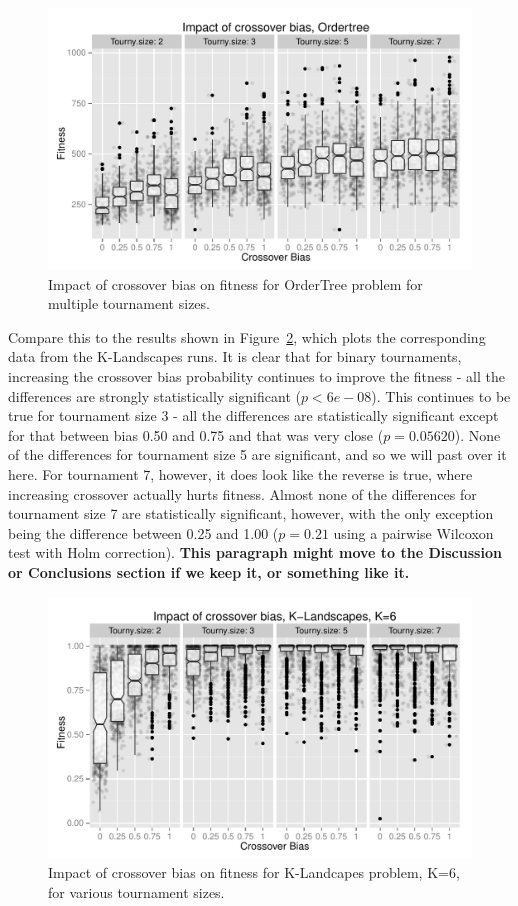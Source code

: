 \documentclass{sig-alternate}
\begin{document}
\begin{figure}
\centering
\includegraphics[width=0.45 \textwidth]{Plots/Ordertree_results_all_tournaments_Jan15.pdf}
\caption{Impact of crossover bias on fitness for OrderTree problem for multiple tournament sizes.}
\label{fig:Ordertree_results_all_tournaments_Jan15}
\end{figure}

Compare this to the results shown in Figure~\ref{fig:KLandscapes6_XO_bias_impact_facets}, which plots the corresponding
data from the K-Landscapes runs. It is clear that for binary tournaments, increasing the crossover bias probability
continues to improve the fitness - all the differences are strongly statistically significant ($p<6e-08$). This
continues to be true for tournament size 3 - all the differences are statistically significant except for that between
bias 0.50 and 0.75 and that was very close ($p=0.05620$). None of the differences for tournament size 5 are
significant, and so we will past over it here. For tournament 7, however, it does look like the reverse is true, where
increasing crossover actually hurts fitness. Almost none of the differences for tournament size 7 are statistically
significant, however, with the only exception being the difference between 0.25 and 1.00 ($p=0.21$ using a pairwise
Wilcoxon test with Holm correction). \textbf{This paragraph might move to the Discussion or Conclusions section if we
keep it, or something like it.}

\begin{figure}
\centering
\includegraphics[width=0.45 \textwidth]{Plots/KLandscapes6_XO_bias_impact_facets.pdf}
\caption{Impact of crossover bias on fitness for K-Landcapes problem, K=6, for various tournament sizes.}
\label{fig:KLandscapes6_XO_bias_impact_facets}
\end{figure}
\end{document}

